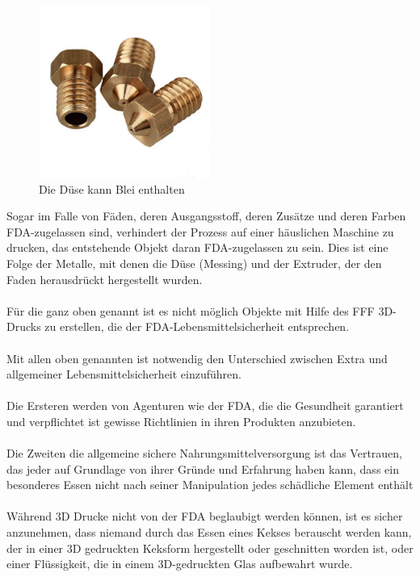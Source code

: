 \documentclass[11pt,a4paper]{article}
\begin{document}
\begin{figure}[H]
\centering
\includegraphics[width=0.5\textwidth,cfbox=azul_marcos 1pt 0pt]{FOTOS/NOZZLES}
\caption*{Die Düse kann Blei enthalten}
\end{figure}
Sogar im Falle von Fäden, deren Ausgangsstoff, deren Zusätze und deren Farben FDA-zugelassen sind, verhindert der Prozess auf einer häuslichen Maschine zu drucken, das entstehende Objekt daran FDA-zugelassen zu sein. Dies ist eine Folge der Metalle, mit denen die Düse (Messing) und der Extruder, der den Faden herausdrückt hergestellt wurden.
\\\\
Für die ganz oben genannt ist es nicht möglich Objekte mit Hilfe des FFF 3D-Drucks zu erstellen, die der FDA-Lebensmittelsicherheit entsprechen.
\\\\
Mit allen oben genannten ist notwendig den Unterschied zwischen Extra und allgemeiner Lebensmittelsicherheit einzuführen.
\\\\
Die Ersteren werden von Agenturen wie der FDA, die die Gesundheit garantiert und verpflichtet ist gewisse Richtlinien in ihren Produkten anzubieten.
\\\\
Die Zweiten die allgemeine sichere Nahrungsmittelversorgung ist das Vertrauen, das jeder auf Grundlage von ihrer Gründe und Erfahrung haben kann, dass ein besonderes Essen nicht nach seiner Manipulation jedes schädliche Element enthält
\\\\
Während 3D Drucke nicht von der FDA beglaubigt werden können, ist es sicher anzunehmen, dass niemand durch das Essen eines Kekses berauscht werden kann, der in einer 3D gedruckten Keksform hergestellt oder geschnitten worden ist, oder einer Flüssigkeit, die in einem 3D-gedruckten Glas aufbewahrt wurde.
\end{document}
